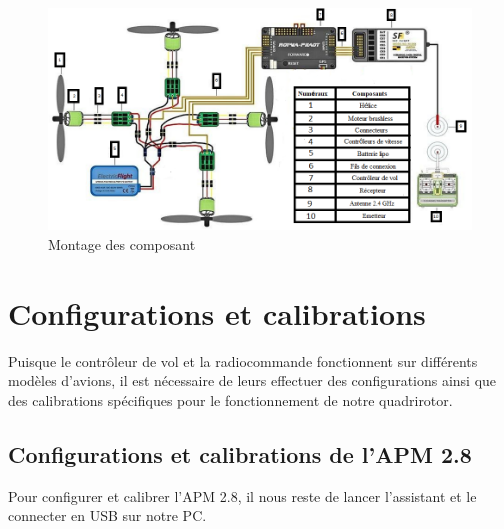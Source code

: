	\begin{figure} [h]
		\begin{center}
			\centering
			\hspace*{-1cm}\includegraphics[width=1.1\linewidth]{Images/Shéma électrique}
		\end{center}
		\caption{Montage des composant}
	\end{figure}
	
	
	\section{Configurations et calibrations}
	Puisque le contrôleur de vol et la radiocommande fonctionnent sur différents modèles d'avions, il est nécessaire de leurs effectuer des configurations  ainsi que  des calibrations spécifiques pour le fonctionnement de notre quadrirotor. 
	\subsection{Configurations et calibrations de l'APM 2.8}
	Pour configurer et calibrer l'APM 2.8, il nous reste  de lancer l’assistant et le connecter en USB sur notre PC.
